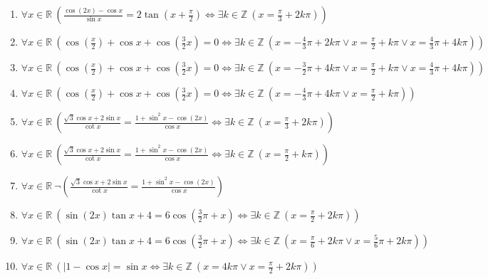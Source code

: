 \documentclass[11pt,a4paper]{article}
\begin{document}
\begin{enumerate}
\item $\displaystyle \forall x \in \mathbb{R}\ \left( \frac{\cos\left(2x\right) - \cos x}{\sin x} = 2\tan\left(x + \frac{\pi}{2}\right) \iff \exists k \in \mathbb{Z}\ \left( x = \frac{\pi}{3} + 2k\pi \right) \right)$
\item $\displaystyle \forall x \in \mathbb{R}\ \left( \cos\left(\frac{x}{2}\right) + \cos x + \cos\left(\frac{3}{2}x\right) = 0 \iff \exists k \in \mathbb{Z}\ \left( x = -\frac{4}{3}\pi + 2k\pi \lor x = \frac{\pi}{2} + k\pi \lor x = \frac{4}{3}\pi + 4k\pi \right) \right)$
\item $\displaystyle \forall x \in \mathbb{R}\ \left( \cos\left(\frac{x}{2}\right) + \cos x + \cos\left(\frac{3}{2}x\right) = 0 \iff \exists k \in \mathbb{Z}\ \left( x = -\frac{3}{2}\pi + 4k\pi \lor x = \frac{\pi}{2} + k\pi \lor x = \frac{4}{3}\pi + 4k\pi \right) \right)$
\item $\displaystyle \forall x \in \mathbb{R}\ \left( \cos\left(\frac{x}{2}\right) + \cos x + \cos\left(\frac{3}{2}x\right) = 0 \iff \exists k \in \mathbb{Z}\ \left( x = -\frac{4}{3}\pi + 4k\pi \lor x = \frac{\pi}{2} + k\pi \right) \right)$
\item $\displaystyle \forall x \in \mathbb{R}\ \left( \frac{\sqrt{3}\cos x + 2\sin x}{\cot x} = \frac{1 + \sin^{2} x - \cos\left(2x\right)}{\cos x} \iff \exists k \in \mathbb{Z}\ \left( x = \frac{\pi}{3} + 2k\pi \right) \right)$
\item $\displaystyle \forall x \in \mathbb{R}\ \left( \frac{\sqrt{3}\cos x + 2\sin x}{\cot x} = \frac{1 + \sin^{2} x - \cos\left(2x\right)}{\cos x} \iff \exists k \in \mathbb{Z}\ \left( x = \frac{\pi}{2} + k\pi \right) \right)$
\item $\displaystyle \forall x \in \mathbb{R}\ \lnot \left( \frac{\sqrt{3}\cos x + 2\sin x}{\cot x} = \frac{1 + \sin^{2} x - \cos\left(2x\right)}{\cos x} \right)$
\item $\displaystyle \forall x \in \mathbb{R}\ \left( \sin\left(2x\right)\tan x + 4 = 6\cos\left(\frac{3}{2}\pi + x\right) \iff \exists k \in \mathbb{Z}\ \left( x = \frac{\pi}{2} + 2k\pi \right) \right)$
\item $\displaystyle \forall x \in \mathbb{R}\ \left( \sin\left(2x\right)\tan x + 4 = 6\cos\left(\frac{3}{2}\pi + x\right) \iff \exists k \in \mathbb{Z}\ \left( x = \frac{\pi}{6} + 2k\pi \lor x = \frac{5}{6}\pi + 2k\pi \right) \right)$
\item $\displaystyle \forall x \in \mathbb{R}\ \left( \left|1 - \cos x\right| = \sin x \iff \exists k \in \mathbb{Z}\ \left( x = 4k\pi \lor x = \frac{\pi}{2} + 2k\pi \right) \right)$

\end{enumerate}
\end{document}

